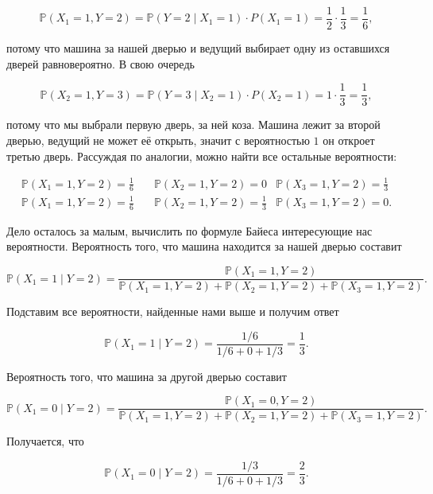 \documentclass[12pt, a4paper, oneside]{extreport}
\def \mbb{\mathbb}
\def \PP{\mbb{P}}
\theoremstyle{plain}              %
\theoremstyle{definition}         %
\begin{document}
\[ \PP(X_1 = 1, Y = 2) = \PP(Y=2 \mid X_1 = 1) \cdot P(X_1 = 1) = \frac{1}{2} \cdot \frac{1}{3} = \frac{1}{6},\]

потому что машина за нашей дверью и ведущий выбирает одну из оставшихся дверей равновероятно.  В свою очередь 

\[ \PP(X_2 = 1, Y = 3) = \PP(Y=3 \mid X_2 = 1) \cdot P(X_2 = 1) = 1 \cdot \frac{1}{3} = \frac{1}{3},\]

потому что мы выбрали первую дверь, за ней коза. Машина лежит за второй дверью, ведущий не может её открыть, значит с вероятностью $1$ он откроет третью дверь. Рассуждая по аналогии, можно найти все остальные вероятности:
 
\begin{equation*}
\begin{aligned} 
\PP(X_1 = 1, Y = 2) = \frac{1}{6}    &  \quad  \PP(X_2 = 1, Y = 2) = 0  &  \PP(X_3 = 1, Y = 2) = \frac{1}{3}\\
\PP(X_1 = 1, Y = 2) = \frac{1}{6}    &   \quad \PP(X_2 = 1,  Y = 2) = \frac{1}{3}  &  \PP(X_3 = 1, Y = 2) = 0.
\end{aligned}
\end{equation*}

Дело осталось за малым, вычислить по формуле Байеса интересующие нас вероятности.  Вероятность того, что машина находится за нашей дверью составит

\begin{equation*}
\PP(X_1 = 1 \mid Y = 2) = \frac{\PP(X_1 = 1, Y = 2)}{\PP(X_1 = 1, Y=2) + \PP(X_2 = 1, Y = 2) +  \PP(X_3 = 1, Y = 2)} .
\end{equation*}

Подставим все вероятности, найденные нами выше и получим ответ 

\begin{equation*}
\PP(X_1 = 1 \mid Y = 2) =   \frac{1/6}{1/6 +  0 + 1/3} =  \frac{1}{3}.
\end{equation*}

Вероятность того, что машина за другой дверью составит

\begin{equation*}
 \PP(X_1 = 0 \mid Y = 2) = \frac{\PP(X_1 = 0, Y = 2)}{\PP(X_1 = 1, Y=2) + \PP(X_2 = 1, Y = 2) +  \PP(X_3 = 1, Y = 2)}.
\end{equation*}

Получается, что 

\begin{equation*}
\PP(X_1 = 0 \mid Y = 2) =   \frac{1/3}{1/6 +  0 + 1/3} =  \frac{2}{3}. 
\end{equation*}
\end{document}
